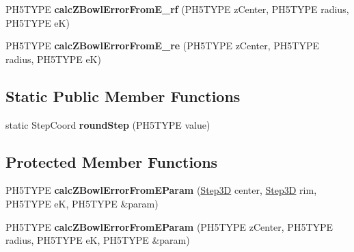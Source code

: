 \begin{DoxyCompactItemize}
\item 
\hypertarget{classfirestep_1_1_delta_calculator_a5b29d922120fbff193a35fcc359fd3e2}{P\+H5\+T\+Y\+P\+E {\bfseries calc\+Z\+Bowl\+Error\+From\+E\+\_\+rf} (P\+H5\+T\+Y\+P\+E z\+Center, P\+H5\+T\+Y\+P\+E radius, P\+H5\+T\+Y\+P\+E e\+K)}\label{classfirestep_1_1_delta_calculator_a5b29d922120fbff193a35fcc359fd3e2}

\item 
\hypertarget{classfirestep_1_1_delta_calculator_a21f9bdd8320bbfad16443462b7e39730}{P\+H5\+T\+Y\+P\+E {\bfseries calc\+Z\+Bowl\+Error\+From\+E\+\_\+re} (P\+H5\+T\+Y\+P\+E z\+Center, P\+H5\+T\+Y\+P\+E radius, P\+H5\+T\+Y\+P\+E e\+K)}\label{classfirestep_1_1_delta_calculator_a21f9bdd8320bbfad16443462b7e39730}

\end{DoxyCompactItemize}
\subsection*{Static Public Member Functions}
\begin{DoxyCompactItemize}
\item 
\hypertarget{classfirestep_1_1_delta_calculator_aa500c2658de5d6e022258b0b238d7cf7}{static Step\+Coord {\bfseries round\+Step} (P\+H5\+T\+Y\+P\+E value)}\label{classfirestep_1_1_delta_calculator_aa500c2658de5d6e022258b0b238d7cf7}

\end{DoxyCompactItemize}
\subsection*{Protected Member Functions}
\begin{DoxyCompactItemize}
\item 
\hypertarget{classfirestep_1_1_delta_calculator_a7262db4daf80f996cdcb796f0cdf7e39}{P\+H5\+T\+Y\+P\+E {\bfseries calc\+Z\+Bowl\+Error\+From\+E\+Param} (\hyperlink{classfirestep_1_1_step3_d}{Step3\+D} center, \hyperlink{classfirestep_1_1_step3_d}{Step3\+D} rim, P\+H5\+T\+Y\+P\+E e\+K, P\+H5\+T\+Y\+P\+E \&param)}\label{classfirestep_1_1_delta_calculator_a7262db4daf80f996cdcb796f0cdf7e39}

\item 
\hypertarget{classfirestep_1_1_delta_calculator_a6ed330b89d3bf684e2ab65a7bb8187bd}{P\+H5\+T\+Y\+P\+E {\bfseries calc\+Z\+Bowl\+Error\+From\+E\+Param} (P\+H5\+T\+Y\+P\+E z\+Center, P\+H5\+T\+Y\+P\+E radius, P\+H5\+T\+Y\+P\+E e\+K, P\+H5\+T\+Y\+P\+E \&param)}\label{classfirestep_1_1_delta_calculator_a6ed330b89d3bf684e2ab65a7bb8187bd}

\end{DoxyCompactItemize}
